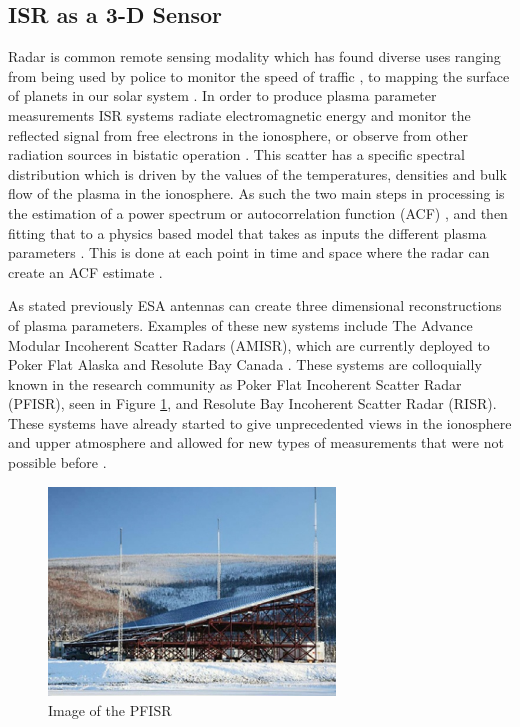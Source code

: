 \subsection{ISR as a 3-D Sensor}
Radar is common remote sensing modality which has found diverse uses ranging from being used by police to monitor the speed of traffic \cite{richards2010principles}, to mapping the surface of planets in our solar system \cite{campbell2002radar}. In order to produce plasma parameter measurements ISR systems radiate electromagnetic energy and monitor the reflected signal from free electrons in the ionosphere, or observe from other radiation sources in bistatic operation \cite{RDS:RDS2903}. This scatter has a specific spectral distribution which is driven by the values of the temperatures, densities and bulk flow of the plasma in the ionosphere\cite{dougherty:farley1960,farleydougherty:ISR2,doughteryfarley:ISR3,hagfors1961}. As such the two main steps in processing is the estimation of a power spectrum or autocorrelation function (ACF) \cite{farley1969}, and then fitting that to a physics based model that takes as inputs the different plasma parameters \cite{RDS:RDS1387}. This is done at each point in time and space where the radar can create an ACF estimate \cite{nikoukar2008}. 

As stated previously ESA antennas can create three dimensional reconstructions of plasma parameters. Examples of these new systems include The Advance Modular Incoherent Scatter Radars (AMISR), which are currently deployed to Poker Flat Alaska and Resolute Bay Canada \cite{Semeter2009738}. These systems are colloquially known in the research community as Poker Flat Incoherent Scatter Radar (PFISR), seen in Figure \ref{fig:amisrpic}, and Resolute Bay Incoherent Scatter Radar (RISR). These systems have already started to give unprecedented views in the ionosphere and upper atmosphere and allowed for new types of measurements that were not possible before \cite{semeter2010CI,butler:imagingfregiondrifts,Nicolls:2007ie}. %

\begin{figure}[!t]
\centering
\includegraphics[width=3in]{amisrimage}
\caption{Image of the PFISR \cite{SRIpage}}
\label{fig:amisrpic}
\end{figure}

